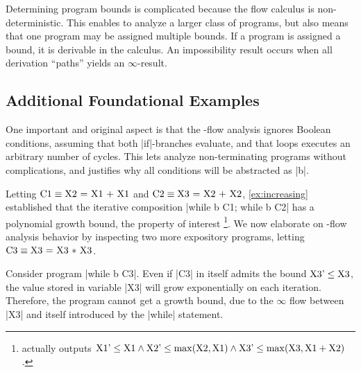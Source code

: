 \documentclass[runningheads]{llncs}
\begin{document}

Determining program bounds is complicated because the flow calculus is non-deterministic.
This enables to analyze a larger class of programs, but also means that one program may be assigned multiple bounds.
If a program is assigned a bound, it is derivable in the calculus.
An impossibility result occurs when all derivation \enquote{paths} yields an $\infty$-result.%



\subsection{Additional Foundational Examples} %
\label{subsec:examples}

One important and original aspect is that the \mwp-flow analysis ignores Boolean conditions, assuming that both \prc|if|-branches evaluate, and that loops executes an arbitrary number of cycles.
This lets \pymwp analyze non-terminating programs without complications, and justifies why all conditions will be abstracted as \prc|b|.

Letting $\text{\prc|C1|}\equiv \text{\prc|X2 = X1 + X1|}$ and $\text{\prc|C2|} \equiv \text{\prc|X3 = X2 + X2|}$, \autoref{ex:increasing} established that the iterative composition \prc|while b C1; while b C2| has a polynomial growth bound, \ie the property of interest%
\footnote{\pymwp actually outputs $\text{\prc|X1|'} \leq \text{\prc|X1|} \wedge \text{\prc|X2|'} \leq \max(\text{\prc|X2|}, \text{\prc|X1|}) \wedge  \text{\prc|X3|'} \leq \max(\text{\prc|X3|},\text{\prc|X1|}+\text{\prc|X2|})$.}.
We now elaborate on \mwp-flow analysis behavior by inspecting two more expository programs, letting $\text{\prc|C3|} \equiv \text{\prc|X3 = X3 * X3|}$.

\begin{example}\label{ex:infinite}
	Consider program \prc|while b C3|.
	Even if \prc|C3| in itself admits the bound $\text{\prc|X3|'} \leq \text{\prc|X3|}$, the value stored in variable \prc|X3| will grow exponentially on each iteration.
	Therefore, the program cannot get a growth bound, due to the $\infty$ flow between \prc|X3| and itself introduced by the \prc|while| statement.
\end{example}
\end{document}
